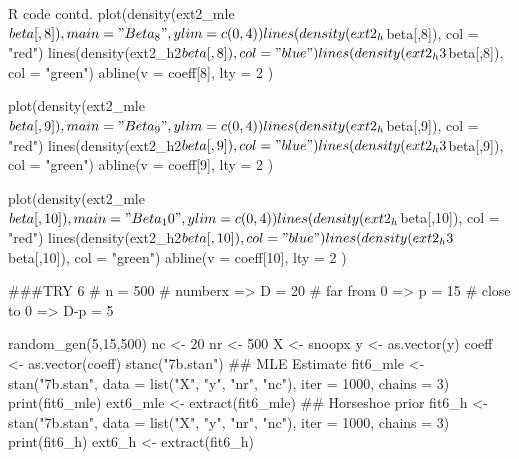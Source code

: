 \documentclass{article}
\begin{document}
\begin{sexylisting}{R code contd.}
plot(density(ext2_mle$beta[,8]), main = "Beta_8", ylim = c(0,4))
lines(density(ext2_h$beta[,8]), col = "red")
lines(density(ext2_h2$beta[,8]), col = "blue")
lines(density(ext2_h3$beta[,8]), col = "green")
abline(v = coeff[8], lty = 2 )

plot(density(ext2_mle$beta[,9]), main = "Beta_9", ylim = c(0,4))
lines(density(ext2_h$beta[,9]), col = "red")
lines(density(ext2_h2$beta[,9]), col = "blue")
lines(density(ext2_h3$beta[,9]), col = "green")
abline(v = coeff[9], lty = 2 )

plot(density(ext2_mle$beta[,10]), main = "Beta_10", ylim = c(0,4))
lines(density(ext2_h$beta[,10]), col = "red")
lines(density(ext2_h2$beta[,10]), col = "blue")
lines(density(ext2_h3$beta[,10]), col = "green")
abline(v = coeff[10], lty = 2 )

###TRY 6
# n = 500
# numberx => D = 20
# far from 0 => p = 15
# close to 0 => D-p = 5

random_gen(5,15,500)
nc <- 20
nr <- 500
X <- snoopx
y <- as.vector(y)
coeff <- as.vector(coeff)
stanc("7b.stan")
## MLE Estimate
fit6_mle <- stan("7b.stan", data = list("X", "y", "nr", "nc"), 
                 iter = 1000, chains = 3)
print(fit6_mle)
ext6_mle <- extract(fit6_mle)
## Horseshoe prior
fit6_h <- stan("7b.stan", data = list("X", "y", "nr", "nc"), 
               iter = 1000, chains = 3)
print(fit6_h)
ext6_h <- extract(fit6_h)
\end{sexylisting}
\end{document}
